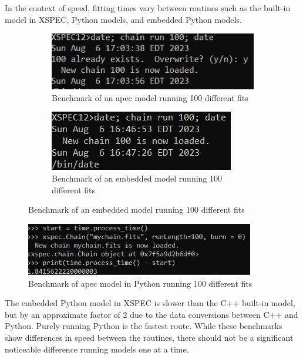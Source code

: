 \documentclass[12pt]{article}
\begin{document}
In the context of speed, fitting times vary between routines such as the built-in model in XSPEC, Python models, and embedded Python models. 
\begin{figure}[H]
\centering
\begin{subfigure}{0.49\textwidth}
\centering
\includegraphics[width = \textwidth]{apecbenchmark}
\caption{Benchmark of an apec model running 100 different fits }
\label{fig:left}
\end{subfigure}
\begin{subfigure}{0.49\textwidth}
\centering
\includegraphics[width = \textwidth]{pyapecbenchmark}
\caption{Benchmark of an embedded model running 100 different fits}
\label{fig:right}
\end{subfigure}
\label{fig:combined}
\end{figure}

\begin{figure}[H]
	\centering
	\includegraphics[width = 10cm]{python}
	\caption {Benchmark of apec model in Python running 100 different fits}
	\label{fig:left}
\end {figure}

The embedded Python model in XSPEC is slower than the C++ built-in model, but by an approximate factor of 2 due to the data conversions between C++ and Python. Purely running Python is the fastest route. While these benchmarks show differences in speed between the routines, there should not be a significant noticeable difference running models one at a time. 
\end{document}
